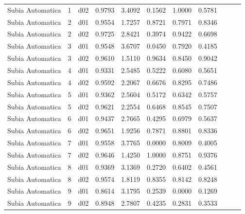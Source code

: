\begin{landscape}
\begin{longtable}{p{2cm}rrrrrrrrrr}
     Subia Automatica  &          1 &     d02 &   0.9793 &  3.4092 &        0.1562 &           1.0000 &  0.5781 \\
     Subia Automatica  &          2 &     d01 &   0.9554 &  1.7257 &        0.8721 &           0.7971 &  0.8346 \\
     Subia Automatica  &          2 &     d02 &   0.9725 &  2.8421 &        0.3974 &           0.9422 &  0.6698 \\
     Subia Automatica  &          3 &     d01 &   0.9548 &  3.6707 &        0.0450 &           0.7920 &  0.4185 \\
     Subia Automatica  &          3 &     d02 &   0.9610 &  1.5110 &        0.9634 &           0.8450 &  0.9042 \\
     Subia Automatica  &          4 &     d01 &   0.9331 &  2.5485 &        0.5222 &           0.6080 &  0.5651 \\
     Subia Automatica  &          4 &     d02 &   0.9592 &  2.2067 &        0.6676 &           0.8295 &  0.7486 \\
     Subia Automatica  &          5 &     d01 &   0.9362 &  2.5604 &        0.5172 &           0.6342 &  0.5757 \\
     Subia Automatica  &          5 &     d02 &   0.9621 &  2.2554 &        0.6468 &           0.8545 &  0.7507 \\
     Subia Automatica  &          6 &     d01 &   0.9437 &  2.7665 &        0.4295 &           0.6979 &  0.5637 \\
     Subia Automatica  &          6 &     d02 &   0.9651 &  1.9256 &        0.7871 &           0.8801 &  0.8336 \\
     Subia Automatica  &          7 &     d01 &   0.9558 &  3.7765 &        0.0000 &           0.8009 &  0.4005 \\
     Subia Automatica  &          7 &     d02 &   0.9646 &  1.4250 &        1.0000 &           0.8751 &  0.9376 \\
     Subia Automatica  &          8 &     d01 &   0.9369 &  3.1369 &        0.2720 &           0.6402 &  0.4561 \\
     Subia Automatica  &          8 &     d02 &   0.9574 &  1.8119 &        0.8355 &           0.8142 &  0.8248 \\
     Subia Automatica  &          9 &     d01 &   0.8614 &  3.1795 &        0.2539 &           0.0000 &  0.1269 \\
     Subia Automatica  &          9 &     d02 &   0.8948 &  2.7807 &        0.4235 &           0.2831 &  0.3533 \\

\end{longtable}
\end{landscape}
